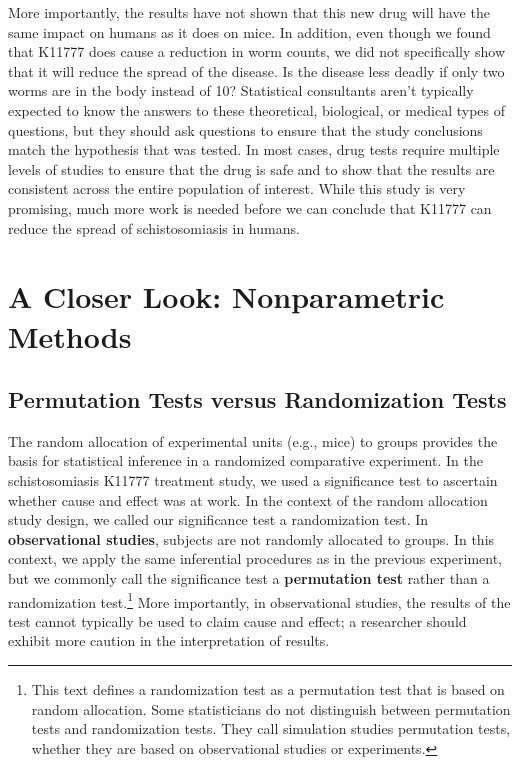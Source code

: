 \documentclass[
]{report}
\theoremstyle{definition}
\theoremstyle{definition}
\theoremstyle{definition}
\theoremstyle{definition}
\theoremstyle{remark}
\begin{document}
More importantly, the results have not shown that this new drug will have the same impact on humans
as it does on mice. In addition, even though we found that K11777 does cause a reduction in worm counts,
we did not specifically show that it will reduce the spread of the disease. Is the disease less deadly if only two
worms are in the body instead of 10? Statistical consultants aren't typically expected to know the answers to
these theoretical, biological, or medical types of questions, but they should ask questions to ensure that the
study conclusions match the hypothesis that was tested. In most cases, drug tests require multiple levels of
studies to ensure that the drug is safe and to show that the results are consistent across the entire population of
interest. While this study is very promising, much more work is needed before we can conclude that K11777
can reduce the spread of schistosomiasis in humans.

\hypertarget{a-closer-look-nonparametric-methods}{%
\chapter*{A Closer Look: Nonparametric Methods}\label{a-closer-look-nonparametric-methods}}

\hypertarget{permutation-tests-versus-randomization-tests}{%
\section{\texorpdfstring{\textbf{Permutation Tests versus Randomization Tests}}{Permutation Tests versus Randomization Tests}}\label{permutation-tests-versus-randomization-tests}}

The random allocation of experimental units (e.g., mice) to groups provides the basis for statistical inference in
a randomized comparative experiment. In the schistosomiasis K11777 treatment study, we used a significance
test to ascertain whether cause and effect was at work. In the context of the random allocation study design,
we called our significance test a randomization test.
\textbar{} In \textbf{observational studies}, subjects are not randomly allocated to groups. In this context, we apply the
same inferential procedures as in the previous experiment, but we commonly call the significance test a
\textbf{permutation test} rather than a randomization test.\footnote{This text defines a randomization test as a permutation test that is based on random allocation. Some statisticians do not
  distinguish between permutation tests and randomization tests. They call simulation studies permutation tests, whether
  they are based on observational studies or experiments.} More importantly, in observational studies, the results
of the test cannot typically be used to claim cause and effect; a researcher should exhibit more caution in the
interpretation of results.
\end{document}
